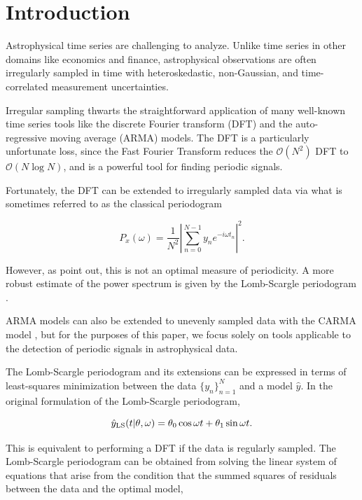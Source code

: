 \documentclass[apj]{emulateapj}
\newcommand{\bigO}{\mathcal{O}}
\begin{document}
\section{Introduction}\label{sec:introduction}

Astrophysical time series are challenging to analyze. Unlike
time series in other domains like economics and finance, astrophysical 
observations are often irregularly sampled in time with heteroskedastic, 
non-Gaussian, and time-correlated measurement uncertainties.

Irregular sampling thwarts the straightforward application of many well-known 
time series tools like the discrete Fourier transform (DFT) and the auto-regressive 
moving average (ARMA) models. The DFT is a particularly unfortunate loss, since
the Fast Fourier Transform \citep{Cooley+Tukey_1965} reduces the $\bigO(N^2)$ DFT
to $\bigO(N\log N)$, and is a powerful tool for finding periodic signals.

Fortunately, the DFT can be extended to irregularly sampled data via what is sometimes
referred to as the classical periodogram \citep{Stoica+Li+He_2009}

\begin{equation}
    P_x(\omega) = \frac{1}{N^2}\left|\sum_{n=0}^{N - 1} y_n e^{- i \omega t_n}\right|^2.
\end{equation}

However, as \cite{Stoica+Li+He_2009} point out, this is not an
optimal measure of periodicity. A more robust estimate of the power spectrum is
given by the Lomb-Scargle periodogram \citep{Lomb_1976,Scargle_1982,Barning_1963,Vanicek_1971}.

ARMA models can also be extended to unevenly sampled data with the CARMA
model \citep{Kelly_etal_2014, Zinn_etal_2016}, but for the purposes of this paper, 
we focus solely on tools applicable to the detection of periodic signals in astrophysical data. 

The Lomb-Scargle periodogram and its extensions can be expressed in terms of 
least-squares minimization between the data $\{y_n\}_{n=1}^N$ and a model $\hat{y}$.
In the original formulation of the Lomb-Scargle periodogram, 

\begin{equation}
    \hat{y}_{\rm LS}(t|\theta, \omega) = \theta_0\cos{\omega t} + \theta_1\sin{\omega t}.
\end{equation}

This is equivalent to performing a DFT if the data is regularly sampled. The Lomb-Scargle
periodogram can be obtained from solving the linear system of equations that arise from
the condition that the summed squares of residuals between the data and the optimal
model,
\end{document}
